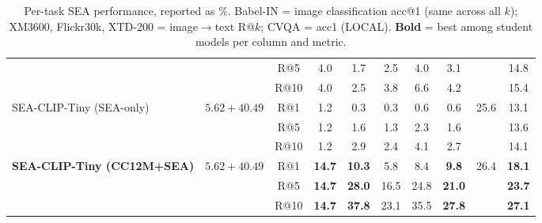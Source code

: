 \documentclass[11pt]{article}
\begin{document}
\begin{table}[h!]
{\begin{tabular}{l c c ccccc c c}
& & R@5  &  4.0 &  1.7 &  2.5 &  4.0 &  3.1 & & 14.8 \\
& & R@10 &  4.0 &  2.5 &  3.8 &  6.6 &  4.2 & & 15.4 \\
\midrule
\multirow{3}{*}{SEA-CLIP-Tiny (SEA-only)}
  & \multirow{3}{*}{$5.62 + 40.49$}
  & R@1  &  1.2 &  0.3 &  0.3 &  0.6 &  0.6 & \multirow{3}{*}{25.6} & 13.1 \\
& & R@5  &  1.2 &  1.6 &  1.3 &  2.3 &  1.6 & & 13.6 \\
& & R@10 &  1.2 &  2.9 &  2.4 &  4.1 &  2.7 & & 14.1 \\
\midrule
\multirow{3}{*}{\textbf{SEA-CLIP-Tiny (CC12M+SEA)}}
  & \multirow{3}{*}{$5.62 + 40.49$}
  & R@1  & \textbf{14.7} & \textbf{10.3} & {5.8} & {8.4} & \textbf{9.8} & \multirow{3}{*}{26.4} & \textbf{18.1} \\
& & R@5  & \textbf{14.7} & \textbf{28.0} & {16.5} & {24.8} & \textbf{21.0} & & \textbf{23.7} \\
& & R@10 & \textbf{14.7} & \textbf{37.8} & {23.1} & {35.5} & \textbf{27.8} & & \textbf{27.1} \\
\bottomrule
\end{tabular}%
}
\caption{Per-task SEA performance, reported as \%.
  Babel-IN = image classification acc@1 (same across all $k$);
  XM3600, Flickr30k, XTD-200 = image$\to$text R@$k$; CVQA = acc1 (LOCAL).
  \textbf{Bold} = best among student models per column and metric.}
\label{tab:per_task_rk}
\end{table}
\end{document}
